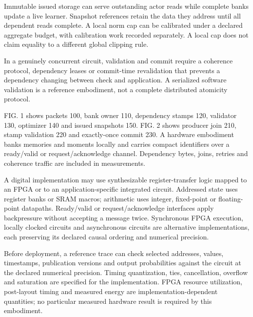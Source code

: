 \documentclass[pct]{sm-patent}
\begin{document}
\pnum Immutable issued storage can serve outstanding actor reads while complete banks update a live learner. Snapshot references retain the data they address until all dependent reads complete. A local norm cap can be calibrated under a declared aggregate budget, with calibration work recorded separately. A local cap does not claim equality to a different global clipping rule.

\pnum In a genuinely concurrent circuit, validation and commit require a coherence protocol, dependency leases or commit-time revalidation that prevents a dependency changing between check and application. A serialized software validation is a reference embodiment, not a complete distributed atomicity protocol.

\pnum FIG. 1 shows packets 100, bank owner 110, dependency stamps 120, validator 130, optimizer 140 and issued snapshots 150. FIG. 2 shows producer join 210, stamp validation 220 and exactly-once commit 230. A hardware embodiment banks memories and moments locally and carries compact identifiers over a ready/valid or request/acknowledge channel. Dependency bytes, joins, retries and coherence traffic are included in measurements.


\pnum A digital implementation may use synthesizable register-transfer logic mapped to an FPGA or to an application-specific integrated circuit. Addressed state uses register banks or SRAM macros; arithmetic uses integer, fixed-point or floating-point datapaths. Ready/valid or request/acknowledge interfaces apply backpressure without accepting a message twice. Synchronous FPGA execution, locally clocked circuits and asynchronous circuits are alternative implementations, each preserving its declared causal ordering and numerical precision.

\pnum Before deployment, a reference trace can check selected addresses, values, timestamps, publication versions and output probabilities against the circuit at the declared numerical precision. Timing quantization, ties, cancellation, overflow and saturation are specified for the implementation. FPGA resource utilization, post-layout timing and measured energy are implementation-dependent quantities; no particular measured hardware result is required by this embodiment.

\claimsstart
\end{document}
